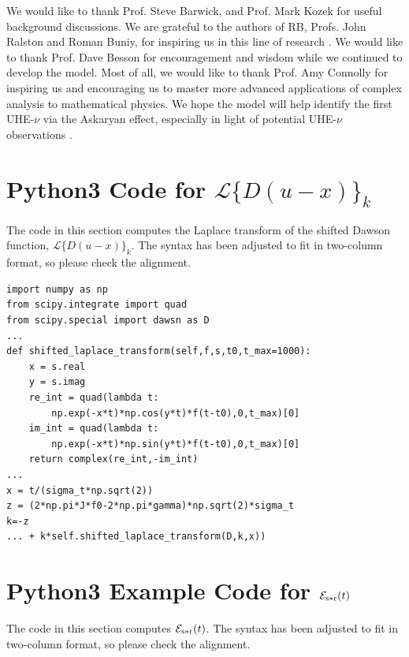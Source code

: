 \documentclass[amsmath,amssymb,aps,prd,10pt,twocolumn,showkeys]{revtex4}
\begin{document}
We would like to thank Prof. Steve Barwick, and Prof. Mark Kozek for useful background discussions.  We are grateful to the authors of RB, Profs. John Ralston and Roman Buniy, for inspiring us in this line of research \cite{10.1103/physrevd.65.016003}.  We would like to thank Prof. Dave Besson for encouragement and wisdom while we continued to develop the model.  Most of all, we would like to thank Prof. Amy Connolly for inspiring us and encouraging us to master more advanced applications of complex analysis to mathematical physics.  We hope the model will help identify the first UHE-$\nu$ via the Askaryan effect, especially in light of potential UHE-$\nu$ observations \cite{collaboration2025observation-22f}.

\appendix

\section{Python3 Code for $\mathcal{L}\lbrace D(u-x)\rbrace_k$}
\label{sec:appA}

The code in this section computes the Laplace transform of the shifted Dawson function, $\mathcal{L}\lbrace D(u-x)\rbrace_k$.  The syntax has been adjusted to fit in two-column format, so please check the alignment.

\small
\begin{verbatim}
import numpy as np
from scipy.integrate import quad
from scipy.special import dawsn as D
...
def shifted_laplace_transform(self,f,s,t0,t_max=1000):
    x = s.real
    y = s.imag
    re_int = quad(lambda t: 
        np.exp(-x*t)*np.cos(y*t)*f(t-t0),0,t_max)[0]
    im_int = quad(lambda t: 
        np.exp(-x*t)*np.sin(y*t)*f(t-t0),0,t_max)[0]
    return complex(re_int,-im_int)
...
x = t/(sigma_t*np.sqrt(2))
z = (2*np.pi*J*f0-2*np.pi*gamma)*np.sqrt(2)*sigma_t
k=-z
... + k*self.shifted_laplace_transform(D,k,x))
\end{verbatim}

\section{Python3 Example Code for $\mathcal{E}_{\rm s * r}(t)$}
\label{sec:appB}

The code in this section computes $\mathcal{E}_{\rm s * r}(t)$.  The syntax has been adjusted to fit in two-column format, so please check the alignment.
\end{document}
